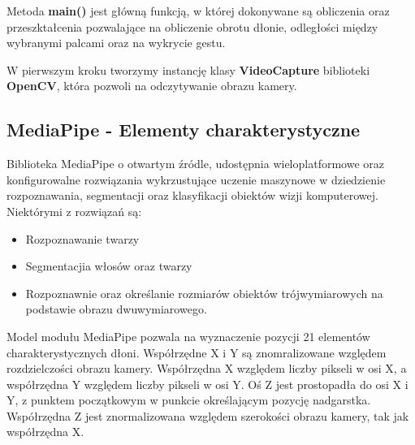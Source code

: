 \quad Metoda \textbf{main()} jest główną funkcją, w której dokonywane są obliczenia oraz przeszktałcenia pozwalające na obliczenie obrotu dłonie, odległości między wybranymi palcami oraz na wykrycie gestu. 


% 

\quad W pierwszym kroku tworzymy instancję klasy \textbf{VideoCapture} biblioteki \textbf{OpenCV}, która pozwoli na odczytywanie obrazu kamery. 

% 



\subsection{MediaPipe - Elementy charakterystyczne}

\quad Biblioteka MediaPipe o otwartym źródle, udostępnia wieloplatformowe oraz konfigurowalne rozwiązania wykrzustujące uczenie maszynowe w dziedzienie rozpoznawania, segmentacji oraz klasyfikacji obiektów wizji komputerowej. Niektórymi z rozwiązań są:

\begin{itemize}
    \item Rozpoznawanie twarzy
    \item Segmentacjia włosów oraz twarzy
    \item Rozpoznawnie oraz określanie rozmiarów obiektów trójwymiarowych 
            na podstawie obrazu dwuwymiarowego. 
\end{itemize}

\quad Model modułu MediaPipe pozwala na wyznaczenie pozycji 21 elementów charakterystycznych dłoni. Współrzędne X i Y są znomralizowane względem rozdzielczości obrazu kamery. Współrzędna X względem liczby pikseli w osi X, a współrzędna Y względem liczby pikseli w osi Y. Oś Z jest prostopadła do osi X i Y, z punktem początkowym w punkcie określającym pozycję nadgarstka. Współrzędna Z jest znormalizowana względem szerokości obrazu kamery, tak jak współrzędna X. 

